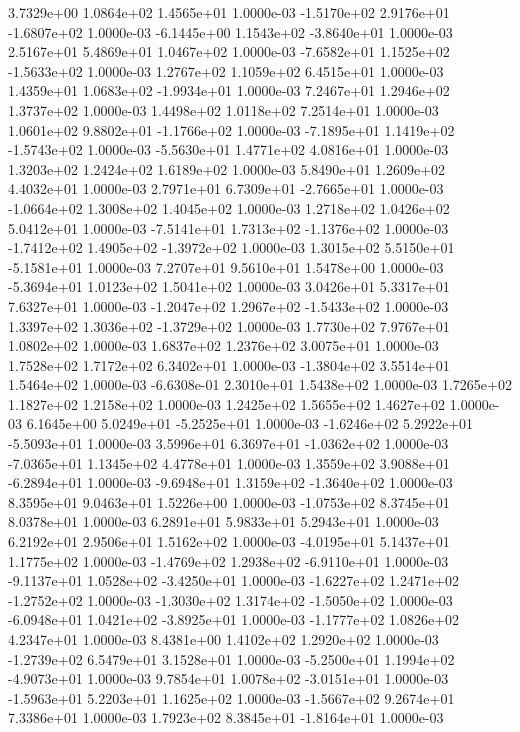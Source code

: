 3.7329e+00 1.0864e+02 1.4565e+01  1.0000e-03
-1.5170e+02  2.9176e+01 -1.6807e+02  1.0000e-03
-6.1445e+00  1.1543e+02 -3.8640e+01  1.0000e-03
2.5167e+01 5.4869e+01 1.0467e+02  1.0000e-03
-7.6582e+01  1.1525e+02 -1.5633e+02  1.0000e-03
1.2767e+02 1.1059e+02 6.4515e+01  1.0000e-03
 1.4359e+01  1.0683e+02 -1.9934e+01  1.0000e-03
7.2467e+01 1.2946e+02 1.3737e+02  1.0000e-03
1.4498e+02 1.0118e+02 7.2514e+01  1.0000e-03
 1.0601e+02  9.8802e+01 -1.1766e+02  1.0000e-03
-7.1895e+01  1.1419e+02 -1.5743e+02  1.0000e-03
-5.5630e+01  1.4771e+02  4.0816e+01  1.0000e-03
1.3203e+02 1.2424e+02 1.6189e+02  1.0000e-03
5.8490e+01 1.2609e+02 4.4032e+01  1.0000e-03
 2.7971e+01  6.7309e+01 -2.7665e+01  1.0000e-03
-1.0664e+02  1.3008e+02  1.4045e+02  1.0000e-03
1.2718e+02 1.0426e+02 5.0412e+01  1.0000e-03
-7.5141e+01  1.7313e+02 -1.1376e+02  1.0000e-03
-1.7412e+02  1.4905e+02 -1.3972e+02  1.0000e-03
 1.3015e+02  5.5150e+01 -5.1581e+01  1.0000e-03
7.2707e+01 9.5610e+01 1.5478e+00  1.0000e-03
-5.3694e+01  1.0123e+02  1.5041e+02  1.0000e-03
3.0426e+01 5.3317e+01 7.6327e+01  1.0000e-03
-1.2047e+02  1.2967e+02 -1.5433e+02  1.0000e-03
 1.3397e+02  1.3036e+02 -1.3729e+02  1.0000e-03
1.7730e+02 7.9767e+01 1.0802e+02  1.0000e-03
1.6837e+02 1.2376e+02 3.0075e+01  1.0000e-03
1.7528e+02 1.7172e+02 6.3402e+01  1.0000e-03
-1.3804e+02  3.5514e+01  1.5464e+02  1.0000e-03
-6.6308e-01  2.3010e+01  1.5438e+02  1.0000e-03
1.7265e+02 1.1827e+02 1.2158e+02  1.0000e-03
1.2425e+02 1.5655e+02 1.4627e+02  1.0000e-03
 6.1645e+00  5.0249e+01 -5.2525e+01  1.0000e-03
-1.6246e+02  5.2922e+01 -5.5093e+01  1.0000e-03
 3.5996e+01  6.3697e+01 -1.0362e+02  1.0000e-03
-7.0365e+01  1.1345e+02  4.4778e+01  1.0000e-03
 1.3559e+02  3.9088e+01 -6.2894e+01  1.0000e-03
-9.6948e+01  1.3159e+02 -1.3640e+02  1.0000e-03
8.3595e+01 9.0463e+01 1.5226e+00  1.0000e-03
-1.0753e+02  8.3745e+01  8.0378e+01  1.0000e-03
6.2891e+01 5.9833e+01 5.2943e+01  1.0000e-03
6.2192e+01 2.9506e+01 1.5162e+02  1.0000e-03
-4.0195e+01  5.1437e+01  1.1775e+02  1.0000e-03
-1.4769e+02  1.2938e+02 -6.9110e+01  1.0000e-03
-9.1137e+01  1.0528e+02 -3.4250e+01  1.0000e-03
-1.6227e+02  1.2471e+02 -1.2752e+02  1.0000e-03
-1.3030e+02  1.3174e+02 -1.5050e+02  1.0000e-03
-6.0948e+01  1.0421e+02 -3.8925e+01  1.0000e-03
-1.1777e+02  1.0826e+02  4.2347e+01  1.0000e-03
8.4381e+00 1.4102e+02 1.2920e+02  1.0000e-03
-1.2739e+02  6.5479e+01  3.1528e+01  1.0000e-03
-5.2500e+01  1.1994e+02 -4.9073e+01  1.0000e-03
 9.7854e+01  1.0078e+02 -3.0151e+01  1.0000e-03
-1.5963e+01  5.2203e+01  1.1625e+02  1.0000e-03
-1.5667e+02  9.2674e+01  7.3386e+01  1.0000e-03
 1.7923e+02  8.3845e+01 -1.8164e+01  1.0000e-03
